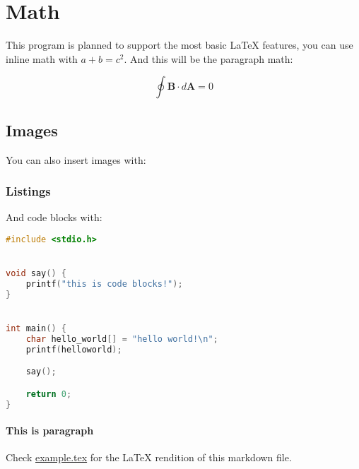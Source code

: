 \documentclass[12pt, a4paper]{article}
\begin{document}
    \section{Math}

    This program is planned to support the most basic LaTeX features, you can use inline math with $a + b = c^2$. And this will be the paragraph math:

    \begin{equation}
        \oint \boldsymbol{B} \cdot d \boldsymbol{A} = 0
    \end{equation}

    \subsection{Images}

    You can also insert images with:

    \subsubsection{Listings}

    And code blocks with:

\begin{lstlisting}[language=C]
#include <stdio.h>


void say() {
    printf("this is code blocks!");
}


int main() {
    char hello_world[] = "hello world!\n";
    printf(helloworld);

    say();

    return 0;
}
\end{lstlisting}

    \paragraph{This is paragraph}

    Check \href{./example.tex}{example.tex} for the LaTeX rendition of this markdown file.
\end{document}
